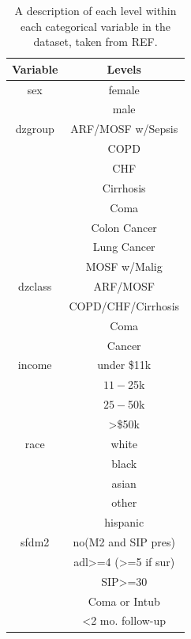 \documentclass[
]{jss}
\begin{document}
\begin{table}[ht]
\centering
\begin{tabular}{cc}
\hline
\textbf{Variable} & \textbf{Levels}                      \\
\hline
sex      & female                                        \\
         & male                                          \\
dzgroup  & ARF/MOSF w/Sepsis                             \\
         & COPD                                          \\
         & CHF                                           \\
         & Cirrhosis                                     \\
         & Coma                                          \\
         & Colon Cancer                                  \\
         & Lung Cancer                                   \\
         & MOSF w/Malig                                  \\
dzclass  & ARF/MOSF                                      \\
         & COPD/CHF/Cirrhosis                            \\
         & Coma                                          \\
         & Cancer                                        \\
income   & under \$11k                                   \\
         & $11-$25k                                      \\
         & $25-$50k                                      \\
         & \textgreater{}\$50k                           \\
race     & white                                         \\
         & black                                         \\
         & asian                                         \\
         & other                                         \\
         & hispanic                                      \\
sfdm2    & no(M2 and SIP pres)                           \\
         & adl\textgreater{}=4 (\textgreater{}=5 if sur) \\
         & SIP\textgreater{}=30                          \\
         & Coma or Intub                                 \\
         & \textless{}2 mo. follow-up                   
\end{tabular}
\caption{A description of each level within each categorical variable in the dataset, taken from REF.}
\label{tab:support2}
\end{table}
\end{document}
